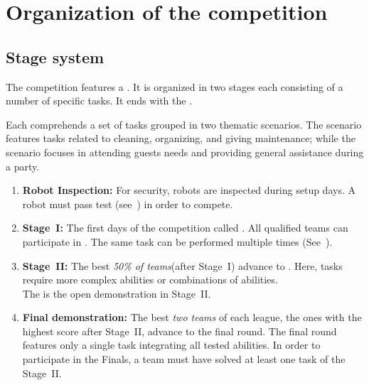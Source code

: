 \section{Organization of the competition}
\label{sec:procedure_during_competition}

\subsection{Stage system}\label{rule:stages}

The competition features a . It is organized in two stages each consisting of a number of specific tasks. It ends with the .

Each  comprehends a set of tasks grouped in two thematic scenarios.
The  scenario features tasks related to cleaning, organizing, and giving maintenance; while the  scenario focuses in attending guests needs and providing general assistance during a party.

\begin{enumerate}
	\item \textbf{Robot Inspection:} For security, robots are inspected during setup days. A robot must pass  test (see~) in order to compete.

	\item \textbf{Stage~I:} The first days of the competition called .
	All qualified teams can participate in .
	The same task can be performed multiple times (See~).

	\item \textbf{Stage~II:} The best \emph{50\% of teams}\footnotemark (after Stage~I) advance to .
	Here, tasks require more complex abilities or combinations of abilities.\\
	The  is the open demonstration in Stage~II.

	\item \textbf{Final demonstration:} The best \emph{two teams} of each league, the ones with the highest score after Stage~II, advance to the final round.
	The final round features only a single task integrating all tested abilities.
	In order to participate in the Finals, a team must have solved at least one task of the Stage~II.
\end{enumerate}

